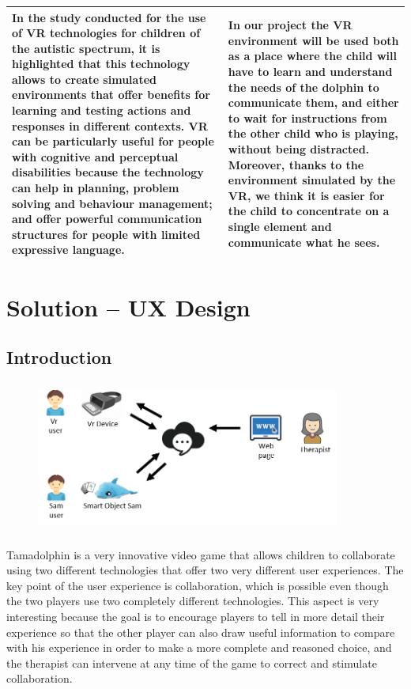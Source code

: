 \documentclass [12pt]{article}
\begin{document}
\begin{itemize}[•]
\begin{tabular}{|p{7cm}|p{7cm}|}
In the study conducted for the use of VR technologies for children of the autistic spectrum, it is highlighted that this technology allows to create simulated environments that offer benefits for learning and testing actions and responses in different contexts.
VR can be particularly useful for people with cognitive and perceptual disabilities because the technology can help in planning, problem solving and behaviour management; and offer powerful communication structures for people with limited expressive language.&In our project the VR environment will be used both as a place where the child will have to learn and understand the needs of the dolphin to communicate them, and either to wait for instructions from the other child who is playing, without being distracted. Moreover, thanks to the environment simulated by the VR, we think it is easier for the child to concentrate on a single element and communicate what he sees.\\
\hline
\end{tabular} 
\end{itemize}


\section{Solution – UX Design}
\subsection{Introduction}

\begin{figure}[ht!]
\centering
\includegraphics[height=5cm,width=10cm]{HighLevel.jpg}
\end{figure}


Tamadolphin is a very innovative video game that allows children to collaborate using two different technologies that offer two very different user experiences. The key point of the user experience is collaboration, which is possible even though the two players use two completely different technologies. This aspect is very interesting because the goal is to encourage players to tell in more detail their experience so that the other player can also draw useful information to compare with his experience in order to make a more complete and reasoned choice, and the therapist can intervene at any time of the game to correct and stimulate collaboration.
\end{document}
